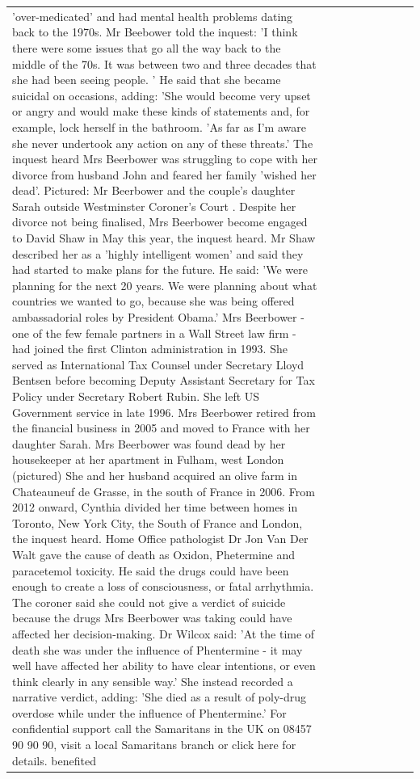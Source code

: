 \begin{table}[H]
\begin{tabular}{lllrlllll}
'over-medicated' and had mental health problems dating back to the 1970s. Mr Beebower told the inquest: 'I think there were some issues that go all the way back to the middle of the 70s. It was between two and three decades that she had been seeing people. ' He said that she became suicidal on occasions, adding: 'She would become very upset or angry and would make these kinds of statements and, for example, lock herself in the bathroom. 'As far as I'm aware she never undertook any action on any of these threats.' The inquest heard Mrs Beerbower was struggling to cope with her divorce from husband John and feared her family 'wished her dead'. Pictured: Mr Beerbower and the couple's daughter Sarah outside Westminster Coroner's Court . Despite her divorce not being finalised, Mrs Beerbower become engaged to David Shaw in May this year, the inquest heard. Mr Shaw described her as a 'highly intelligent women' and said they had started to make plans for the future. He said: 'We were planning for the next 20 years. We were planning about what countries we wanted to go, because she was being offered ambassadorial roles by President Obama.' Mrs Beerbower - one of the few female partners in a Wall Street law firm - had joined the first Clinton administration in 1993. She served as International Tax Counsel under Secretary Lloyd Bentsen before becoming Deputy Assistant Secretary for Tax Policy under Secretary Robert Rubin. She left US Government service in late 1996. Mrs Beerbower retired from the financial business in 2005 and moved to France with her daughter Sarah. Mrs Beerbower was found dead by her housekeeper at her apartment in Fulham, west London (pictured) She and her husband acquired an olive farm in Chateauneuf de Grasse, in the south of France in 2006. From 2012 onward, Cynthia divided her time between homes in Toronto, New York City, the South of France and London, the inquest heard. Home Office pathologist Dr Jon Van Der Walt gave the cause of death as Oxidon, Phetermine and paracetemol toxicity. He said the drugs could have been enough to create a loss of consciousness, or fatal arrhythmia. The coroner said she could not give a verdict of suicide because the drugs Mrs Beerbower was taking could have affected her decision-making. Dr Wilcox said: 'At the time of death she was under the influence of Phentermine - it may well have affected her ability to have clear intentions, or even think clearly in any sensible way.' She instead recorded a narrative verdict, adding: 'She died as a result of poly-drug overdose while under the influence of Phentermine.' For confidential support call the Samaritans in the UK on 08457 90 90 90, visit a local Samaritans branch or click here for details. benefited \\

\end{tabular}
\end{table}
